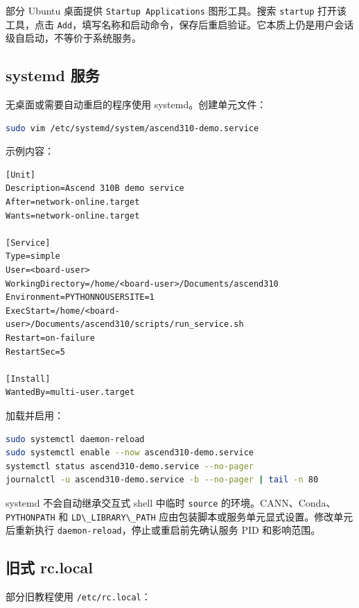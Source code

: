 部分 Ubuntu 桌面提供 \passthrough{\lstinline!Startup Applications!}
图形工具。搜索 \passthrough{\lstinline!startup!} 打开该工具，点击
\passthrough{\lstinline!Add!}，填写名称和启动命令，保存后重启验证。它本质上仍是用户会话级自启动，不等价于系统服务。

\subsection{systemd 服务}\label{systemd-ux670dux52a1}

无桌面或需要自动重启的程序使用 systemd。创建单元文件：

\begin{lstlisting}[language=bash]
sudo vim /etc/systemd/system/ascend310-demo.service
\end{lstlisting}

示例内容：

\begin{lstlisting}
[Unit]
Description=Ascend 310B demo service
After=network-online.target
Wants=network-online.target

[Service]
Type=simple
User=<board-user>
WorkingDirectory=/home/<board-user>/Documents/ascend310
Environment=PYTHONNOUSERSITE=1
ExecStart=/home/<board-user>/Documents/ascend310/scripts/run_service.sh
Restart=on-failure
RestartSec=5

[Install]
WantedBy=multi-user.target
\end{lstlisting}

加载并启用：

\begin{lstlisting}[language=bash]
sudo systemctl daemon-reload
sudo systemctl enable --now ascend310-demo.service
systemctl status ascend310-demo.service --no-pager
journalctl -u ascend310-demo.service -b --no-pager | tail -n 80
\end{lstlisting}

systemd 不会自动继承交互式 shell 中临时 \passthrough{\lstinline!source!}
的环境。CANN、Conda、\passthrough{\lstinline!PYTHONPATH!} 和
\passthrough{\lstinline!LD\_LIBRARY\_PATH!}
应由包装脚本或服务单元显式设置。修改单元后重新执行
\passthrough{\lstinline!daemon-reload!}，停止或重启前先确认服务 PID
和影响范围。

\subsection{旧式 rc.local}\label{ux65e7ux5f0f-rc.local}

部分旧教程使用 \passthrough{\lstinline!/etc/rc.local!}：

